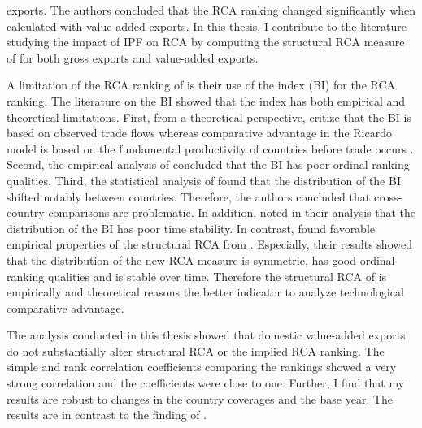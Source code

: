 exports. The authors concluded that the RCA ranking changed significantly when calculated with value-added exports.  In this thesis, I contribute to the literature studying the impact of IPF on RCA  by computing the structural RCA measure of  \textcite{costinot} for both gross exports and value-added exports.
\par %
A limitation of the RCA ranking of  \textcite{Koopman} is their use of the \textcite{Balassa} index (BI) for the RCA ranking. The literature on the BI showed that the index has both empirical and theoretical limitations.
 First, from a theoretical perspective,\textcite{Leromain} critize that the BI is based on observed trade flows whereas comparative advantage in the Ricardo model is based on the fundamental productivity of countries before trade occurs \parencite{Leromain}.  Second, the empirical analysis of \textcite{yeats} concluded that the BI has poor ordinal ranking qualities. Third, the statistical analysis of \textcite{hinloopen2001} found that the distribution of the BI shifted notably between countries. Therefore, the authors concluded
that cross-country comparisons are problematic.  In addition, \textcite{Leromain} noted in their analysis that the distribution of the BI has poor time stability. In contrast, 
\textcite{Leromain} found favorable empirical properties of the structural RCA from \textcite{costinot}. Especially, their results showed that the distribution of the new RCA measure is symmetric, has good ordinal ranking qualities and is stable over time.  Therefore the structural RCA of \textcite{costinot} is empirically and theoretical reasons the better indicator to analyze technological comparative advantage.    \par
The analysis conducted in this thesis showed that domestic value-added exports do not substantially alter structural RCA or the implied RCA ranking. The simple and rank correlation coefficients comparing the rankings showed a very strong correlation and the coefficients were close to one. Further, I find that my results are robust to changes in the country coverages and the base year. The results are in contrast to the finding of \textcite{Koopman}. \par
